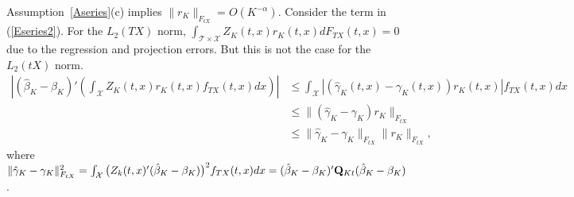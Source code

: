 \documentclass[lettersize, 12pt]{article}
\begin{document}
{%
Assumption~\ref{Aseries}(c) implies $\|r_K\|_{F_{tX}} = O(K^{-\alpha})$.
Consider the term in (\ref{Eseries2}).
For the $L_2(TX)$ norm, $\int_{\mathcal{T}\times\mathcal{X}} Z_K(t,x) r_K(t,x) dF_{TX}(t,x)=0$ due to the regression and projection errors. 
But this is not the case for the $L_2(tX)$ norm.
\begin{align*}
\left| (\hat\beta_K - \beta_K)'\left( \int_\mathcal{X} Z_K(t,x) r_K(t,x) f_{TX}(t,x)dx\right) \right| 
&\leq
\int_\mathcal{X} \left| \left(\hat\gamma_K(t,x) - \gamma_K(t,x)\right) r_K(t,x) \right|  f_{TX}(t,x)dx  
\\&\leq 
\|  \left(\hat\gamma_K - \gamma_K\right) r_K  \|_{F_{tX}}
\\&\leq 
\|\hat\gamma_K - \gamma_K\|_{F_{tX}} \|r_K\|_{F_{tX}},
\end{align*}
where
$\|\hat\gamma_K - \gamma_K\|_{F_{tX}}^2 = \int_\mathcal{X}\big(Z_k(t,x)'(\hat\beta_K-\beta_K)\big)^2 f_{TX}(t,x)dx 
= (\hat\beta_K - \beta_K)' {\bf Q}_{Kt} (\hat\beta_K - \beta_K)$.

}
\end{document}
